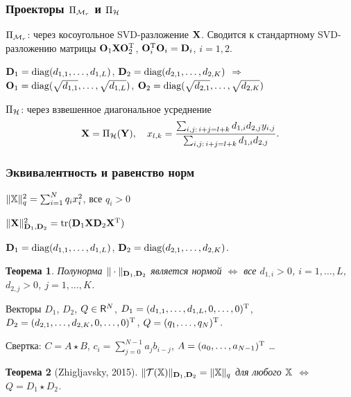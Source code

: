 \documentclass[unicode, notheorems]{beamer}
\newtheorem{theorem}{Теорема}
\begin{document}
\begin{frame}
	\frametitle{Проекторы $\Pi_{\mathcal{M}_r}$ и $\Pi_{\mathcal{H}}$}
	
	$\Pi_{\mathcal{M}_r}$: через косоугольное SVD-разложение $\mathbf{X}$. Сводится к стандартному SVD-разложению матрицы $\mathbf{O}_1 \mathbf{X} \mathbf{O}_2^{\mathrm{T}}$, $\mathbf{O}_i^{\mathrm{T}} \mathbf{O}_i = \mathbf{D}_i$, $i = 1, 2.$
	
	$\mathbf{D}_1 = \text{diag}(d_{1, 1}, \ldots, d_{1, L})$, $\mathbf{D}_2 = \text{diag}(d_{2, 1}, \ldots, d_{2, K})$ $\Longrightarrow$ $\mathbf{O}_1 = \text{diag}(\sqrt{d_{1, 1}}, \ldots, \sqrt{d_{1, L}})$, $\mathbf{O}_2 = \text{diag}(\sqrt{d_{2, 1}}, \ldots, \sqrt{d_{2, K}})$
	
	\vspace{0.4cm}
	$\Pi_{\mathcal{H}}$: через взвешенное диагональное усреднение
	\begin{equation*}
	\mathbf{X} = \Pi_{\mathcal{H}}(\mathbf{Y}), \quad x_{l,k} = \frac{\sum_{i,j:\, i+j=l+k} d_{1, i} d_{2, j} y_{i,j}}{\sum_{i,j:\, i+j=l+k} d_{1, i} d_{2, j}}.
	\end{equation*}
\end{frame}


\begin{frame}
	\frametitle{Эквивалентность и равенство норм}
    $\|\mathbb{X}\|_q^2 = \sum_{i = 1}^N q_i x_i^2$, все $q_i > 0$
    
    $\|\mathbf{X}\|^2_{\mathbf{D}_1, \mathbf{D}_2} = \text{tr}(\mathbf{D}_1 \mathbf{X} \mathbf{D}_2 \mathbf{X}^{\mathrm{T}})$
    
    $\mathbf{D}_1 = \text{diag}(d_{1, 1}, \ldots, d_{1, L})$, $\mathbf{D}_2 = \text{diag}(d_{2, 1}, \ldots, d_{2, K})$.
	
	\begin{theorem}
		Полунорма $\|\cdot\|_{\mathbf{D}_1, \mathbf{D}_2}$ является нормой $\Leftrightarrow$ все $d_{1, i} > 0$, $i = 1, \ldots, L$, $d_{2, j} > 0$, $j = 1, \ldots, K$.
	\end{theorem}
	\vspace{0.2cm}
	Векторы $D_1$, $D_2$, $Q \in \mathsf{R}^N$, $D_1 = (d_{1, 1}, \ldots, d_{1, L}, 0, \ldots, 0)^{\mathrm{T}}$, $D_2 = (d_{2, 1}, \ldots, d_{2, K}, 0, \ldots, 0)^{\mathrm{T}}$, $Q = (q_1, \ldots, q_N)^{\mathrm{T}}$.
	
	Свертка: $C = A \star B$, $c_{i} = \sum_{j=0}^{N-1} a_{j} b_{i-j}$, $A = (a_0, \ldots, a_{N-1})^{\mathrm{T}}$ \ldots
	\begin{theorem}[Zhigljavsky, 2015]
		$\|\mathcal{T}(\mathbb{X})\|_{\mathbf{D}_1, \mathbf{D}_2} = \|\mathbb{X}\|_q$ для любого $\mathbb{X}$ $\Leftrightarrow$ $Q = D_1 \star D_2$.
	\end{theorem}
\end{frame}
\end{document}
